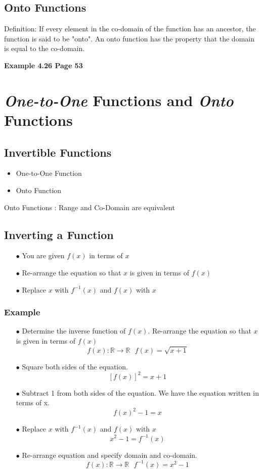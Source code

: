 \documentclass[]{report}
\begin{document}
\subsection{Onto Functions}
Definition: If every element in the co-domain of the function has an ancestor, the function is said to be "onto".
An onto function has the property that the domain is equal to the co-domain.


\textbf{Example 4.26 Page 53}

\section{\textit{One-to-One} Functions and \textit{Onto} Functions}

\subsection{Invertible Functions}
\begin{itemize}
\item One-to-One Function
\item Onto Function
\end{itemize}

Onto Functions : Range and Co-Domain are equivalent

\subsection{Inverting a Function}

\begin{itemize}
\item[$\bullet$] You are given $f(x)$ in terms of $x$
\item[$\bullet$] Re-arrange the equation so that $x$ is given in terms of $f(x)$
\item[$\bullet$] Replace $x$ with $f^{-1}(x)$ and $f(x)$ with $x$
\end{itemize}

\subsubsection{Example}
\begin{itemize}
\item[$\bullet$]Determine the inverse function of $f(x)$. Re-arrange the equation so that $x$ is given in terms of $f(x)$
\[  f(x): \mathbb{R} \rightarrow \mathbb{R}  \mbox{   } f(x)  = \sqrt{x+1} \]
\item[$\bullet$] Square both sides of the equation.
\[[f(x)]^2 = x+1 \]
\item[$\bullet$] Subtract 1 from both sides of the equation. We have the equation written in terms of x.
\[f(x)^2-1 = x \]
\item[$\bullet$] Replace $x$ with $f^{-1}(x)$ and $f(x)$ with $x$
\[x^2-1 = f^{-1}(x) \]
\item[$\bullet$] 
Re-arrange equation and specify domain and co-domain.
\[ f(x): \mathbb{R} \rightarrow \mathbb{R}  \mbox{   }  f^{-1}(x) = x^2-1  \]
\end{itemize}
\newpage
\end{document}
